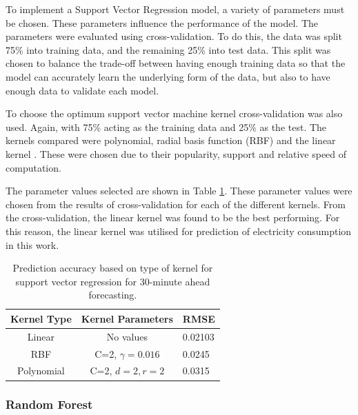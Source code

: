 To implement a Support Vector Regression model, a variety of parameters must be chosen. These parameters influence the performance of the model. The parameters were evaluated using cross-validation. To do this, the data was split 75\% into training data, and the remaining 25\% into test data. This split was chosen to balance the trade-off between having enough training data so that the model can accurately learn the underlying form of the data, but also to have enough data to validate each model.

To choose the optimum support vector machine kernel cross-validation was also used. Again, with 75\% acting as the training data and 25\% as the test. The kernels compared were polynomial, radial basis function (RBF) and the linear kernel \cite{Chang2010, theodoridis2009pattern}. These were chosen due to their popularity, support and relative speed of computation.

The parameter values selected are shown in Table \ref{forecasting:tab:kernel}. These parameter values were chosen from the results of cross-validation for each of the different kernels.  From the cross-validation, the linear kernel was found to be the best performing. For this reason, the linear kernel was utilised for prediction of electricity consumption in this work.

\begin{table}
	\centering
	\begin{tabular}{ccl}
		\toprule
		Kernel Type& Kernel Parameters & RMSE\\
		\midrule
		Linear & No values & 0.02103\\
		RBF & C=2, $\gamma=0.016$ & 0.0245\\
		Polynomial & C=2, $d=2, r=2$ & 0.0315 \\
		\bottomrule
	\end{tabular}
	\caption{Prediction accuracy based on type of kernel for support vector regression for 30-minute ahead forecasting.}
	\label{forecasting:tab:kernel}
\end{table}


\subsubsection{Random Forest}

